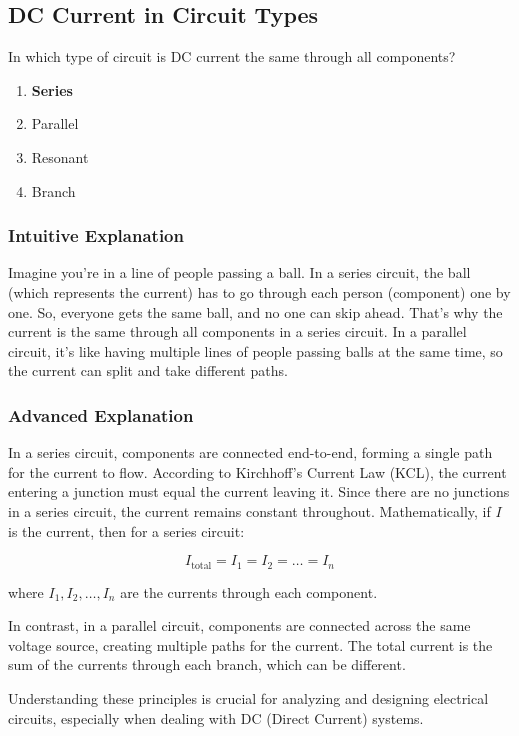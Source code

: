 \subsection{DC Current in Circuit Types}
\label{T5D13}

\begin{tcolorbox}[colback=gray!10!white,colframe=black!75!black,title=T5D13]
In which type of circuit is DC current the same through all components?
\begin{enumerate}[label=\Alph*)]
    \item \textbf{Series}
    \item Parallel
    \item Resonant
    \item Branch
\end{enumerate}
\end{tcolorbox}

\subsubsection{Intuitive Explanation}
Imagine you're in a line of people passing a ball. In a series circuit, the ball (which represents the current) has to go through each person (component) one by one. So, everyone gets the same ball, and no one can skip ahead. That's why the current is the same through all components in a series circuit. In a parallel circuit, it's like having multiple lines of people passing balls at the same time, so the current can split and take different paths.

\subsubsection{Advanced Explanation}
In a series circuit, components are connected end-to-end, forming a single path for the current to flow. According to Kirchhoff's Current Law (KCL), the current entering a junction must equal the current leaving it. Since there are no junctions in a series circuit, the current remains constant throughout. Mathematically, if \( I \) is the current, then for a series circuit:

\[ I_{\text{total}} = I_1 = I_2 = \dots = I_n \]

where \( I_1, I_2, \dots, I_n \) are the currents through each component.

In contrast, in a parallel circuit, components are connected across the same voltage source, creating multiple paths for the current. The total current is the sum of the currents through each branch, which can be different.

Understanding these principles is crucial for analyzing and designing electrical circuits, especially when dealing with DC (Direct Current) systems.

